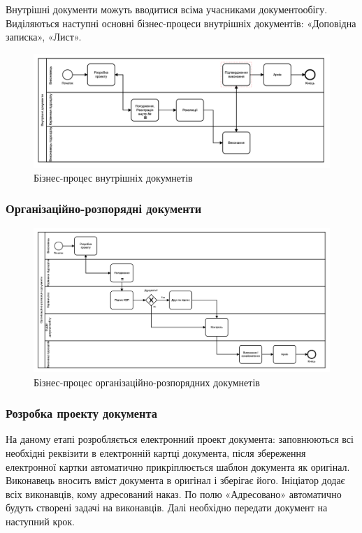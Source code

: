 Внутрішні документи можуть вводитися всіма учасниками документообігу.
Виділяються наступні основні бізнес-процеси внутрішніх
документів: «Доповідна записка», «Лист».

\begin{figure}[!htbp]
\centerline{\includegraphics[scale=0.27]{internalDoc.png}}
\caption{Бізнес-процес внутрішніх докумнетів}
\end{figure}

\subsubsection{Організаційно-розпорядні документи}

\begin{figure}[!htbp]
\centerline{\includegraphics[scale=0.25]{orgDoc.png}}
\caption{Бізнес-процес організаційно-розпорядних докумнетів}
\end{figure}

\subsubsection*{Розробка проекту документа}

На даному етапі розробляється електронний проект документа:
заповнюються всі необхідні реквізити в електронній картці документа,
після збереження електронної картки автоматично прикріплюється шаблон
документа як оригінал. Виконавець вносить вміст документа в оригінал
і зберігає його. Ініціатор додає всіх виконавців, кому адресований
наказ. По полю «Адресовано» автоматично будуть створені задачі на виконавців.
Далі необхідно передати документ на наступний крок.

